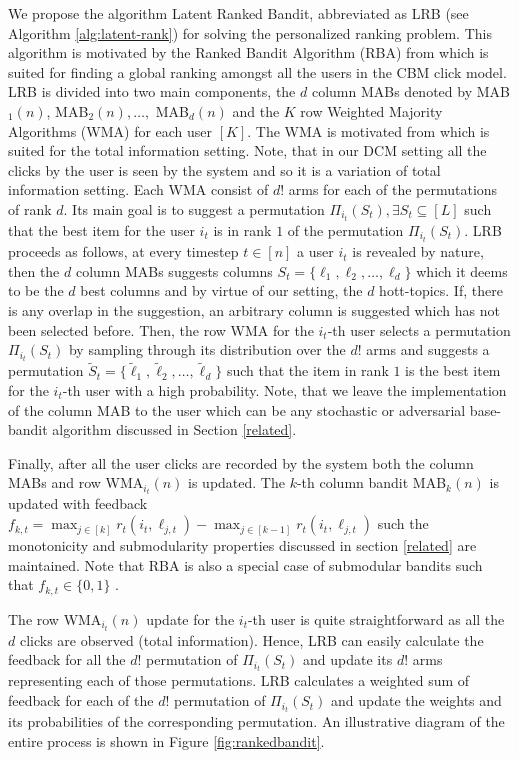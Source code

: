 We propose the algorithm Latent Ranked Bandit, abbreviated as LRB (see Algorithm \ref{alg:latent-rank}) for solving the personalized ranking problem. This algorithm is motivated by the Ranked Bandit Algorithm (RBA) from \citet{radlinski2008learning} which is suited for finding a global ranking amongst all the users in the CBM click model. LRB is divided into two main components, the $d$ column MABs denoted by MAB$_1(n)$, MAB$_2(n), \dots,$ MAB$_d(n)$ and the $K$ row Weighted Majority Algorithms (WMA) for each user $[K]$. The WMA is motivated from \citet{littlestone1994weighted} which is suited for the total information setting. Note, that in our DCM setting all the clicks by the user is seen by the system and so it is a variation of total information setting. Each WMA consist of $d!$ arms for each of the permutations of rank $d$. Its main goal is to suggest a permutation $\Pi_{i_t}(S_t), \exists S_t \subseteq [L]$ such that the best item for the user $i_t$ is in rank $1$ of the permutation $\Pi_{i_t}(S_t)$.  LRB proceeds as follows, at every timestep $t\in[n]$ a user $i_t$ is revealed by nature, then the $d$ column MABs suggests columns $S_t = \lbrace {\ell}_{1}, {\ell}_{2},\dots, {\ell}_{d} \rbrace$ which it deems to be the $d$ best columns and by virtue of our setting, the $d$ hott-topics. If, there is any overlap in the suggestion, an arbitrary column is suggested which has not been selected before. Then, the row WMA for the $i_t$-th user selects a permutation $\Pi_{i_t}(S_t)$ by sampling through its distribution over the $d!$ arms and suggests a permutation $\tilde{S}_t = \lbrace \tilde{\ell}_{1}, \tilde{\ell}_{2},\dots, \tilde{\ell}_{d}\rbrace$ such that the item in rank $1$ is the best item for the $i_t$-th user with a high probability. Note, that we leave the implementation of the column MAB to the user which can be any stochastic or adversarial base-bandit algorithm discussed in Section \ref{related}.

Finally, after all the user clicks are recorded by the system both the column MABs and row WMA$_{i_t}(n)$ is updated. The $k$-th column bandit MAB$_k(n)$ is updated with feedback $f_{k,t} = \max_{j\in [k]} r_t(i_t, \ell_{j,t}) - \max_{j\in [k-1]} r_t(i_t,\ell_{j,t})$ such the monotonicity and submodularity properties discussed in section \ref{related} are maintained. Note that RBA is also a special case of submodular bandits such that $f_{k,t}\in\lbrace 0, 1\rbrace$ \citep{streeter2009online}. 


The row WMA$_{i_t}(n)$ update for the $i_t$-th user is quite straightforward as all the $d$ clicks are observed (total information). Hence, LRB can easily calculate the feedback for all the $d!$ permutation of $\Pi_{i_t}(S_t)$ and update its $d!$ arms representing each of those permutations. LRB calculates a weighted sum of feedback for each of the $d!$ permutation of $\Pi_{i_t}(S_t)$ and update the weights and its probabilities of the corresponding permutation. An illustrative diagram of the entire process is shown in Figure \ref{fig:rankedbandit}.

